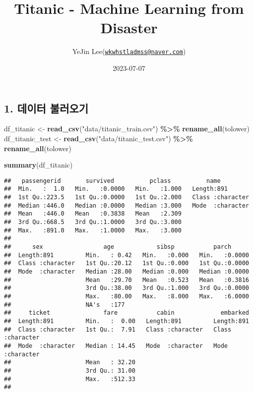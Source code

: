 \documentclass[
]{article}
\title{Titanic - Machine Learning from Disaster}
\author{YeJin
Lee(\href{mailto:wkwhstladmss@naver.com}{\nolinkurl{wkwhstladmss@naver.com}})}
\date{2023-07-07}
\newenvironment{Shaded}{\begin{snugshade}}{\end{snugshade}}
\newcommand{\FunctionTok}[1]{\textcolor[rgb]{0.13,0.29,0.53}{\textbf{#1}}}
\newcommand{\NormalTok}[1]{#1}
\newcommand{\OtherTok}[1]{\textcolor[rgb]{0.56,0.35,0.01}{#1}}
\newcommand{\SpecialCharTok}[1]{\textcolor[rgb]{0.81,0.36,0.00}{\textbf{#1}}}
\newcommand{\StringTok}[1]{\textcolor[rgb]{0.31,0.60,0.02}{#1}}
\begin{document}
\maketitle

{
\setcounter{tocdepth}{3}
\tableofcontents
}
\hypertarget{uxb370uxc774uxd130-uxbd88uxb7ecuxc624uxae30}{%
\subsection{1. 데이터
불러오기}\label{uxb370uxc774uxd130-uxbd88uxb7ecuxc624uxae30}}

\begin{Shaded}
\begin{Highlighting}[]
\NormalTok{df\_titanic }\OtherTok{\textless{}{-}}
  \FunctionTok{read\_csv}\NormalTok{(}\StringTok{"data/titanic\_train.csv"}\NormalTok{) }\SpecialCharTok{\%\textgreater{}\%} 
  \FunctionTok{rename\_all}\NormalTok{(tolower)}
\NormalTok{df\_titanic\_test }\OtherTok{\textless{}{-}}
  \FunctionTok{read\_csv}\NormalTok{(}\StringTok{"data/titanic\_test.csv"}\NormalTok{) }\SpecialCharTok{\%\textgreater{}\%} 
  \FunctionTok{rename\_all}\NormalTok{(tolower)}

\FunctionTok{summary}\NormalTok{(df\_titanic)}
\end{Highlighting}
\end{Shaded}

\begin{verbatim}
##   passengerid       survived          pclass          name          
##  Min.   :  1.0   Min.   :0.0000   Min.   :1.000   Length:891        
##  1st Qu.:223.5   1st Qu.:0.0000   1st Qu.:2.000   Class :character  
##  Median :446.0   Median :0.0000   Median :3.000   Mode  :character  
##  Mean   :446.0   Mean   :0.3838   Mean   :2.309                     
##  3rd Qu.:668.5   3rd Qu.:1.0000   3rd Qu.:3.000                     
##  Max.   :891.0   Max.   :1.0000   Max.   :3.000                     
##                                                                     
##      sex                 age            sibsp           parch       
##  Length:891         Min.   : 0.42   Min.   :0.000   Min.   :0.0000  
##  Class :character   1st Qu.:20.12   1st Qu.:0.000   1st Qu.:0.0000  
##  Mode  :character   Median :28.00   Median :0.000   Median :0.0000  
##                     Mean   :29.70   Mean   :0.523   Mean   :0.3816  
##                     3rd Qu.:38.00   3rd Qu.:1.000   3rd Qu.:0.0000  
##                     Max.   :80.00   Max.   :8.000   Max.   :6.0000  
##                     NA's   :177                                     
##     ticket               fare           cabin             embarked        
##  Length:891         Min.   :  0.00   Length:891         Length:891        
##  Class :character   1st Qu.:  7.91   Class :character   Class :character  
##  Mode  :character   Median : 14.45   Mode  :character   Mode  :character  
##                     Mean   : 32.20                                        
##                     3rd Qu.: 31.00                                        
##                     Max.   :512.33                                        
## 
\end{verbatim}
\end{document}
